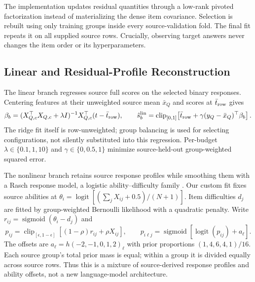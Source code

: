 \documentclass{article}
\newcommand{\clip}{\operatorname{clip}_{[0,1]}}
\newcommand{\sigmoid}{\operatorname{sigmoid}}
\begin{document}
The implementation updates residual quantities through a low-rank pivoted factorization instead of materializing the dense item covariance. Selection is rebuilt using only training groups inside every source-validation fold. The final fit repeats it on all supplied source rows. Crucially, observing target answers never changes the item order or its hyperparameters.

\subsection{Linear and Residual-Profile Reconstruction}
The linear branch regresses source full scores on the selected binary responses. Centering features at their unweighted source mean $\bar x_Q$ and scores at $\bar t_{\rm row}$ gives
\begin{equation}
 \beta_b=(X_{Q,c}^{\top}X_{Q,c}+\lambda I)^{-1}X_{Q,c}^{\top}(t-\bar t_{\rm row}),\qquad
 \hat s^{\rm lin}_b=\clip\!\left[\bar t_{\rm row}+\gamma(y_Q-\bar x_Q)^\top\beta_b\right].
\end{equation}
The ridge fit itself is row-unweighted; group balancing is used for selecting configurations, not silently substituted into this regression. Per-budget $\lambda\in\{0.1,1,10\}$ and $\gamma\in\{0,0.5,1\}$ minimize source-held-out group-weighted squared error.

The nonlinear branch retains source response profiles while smoothing them with a Rasch response model, a logistic ability--difficulty family \citep[Chap.~2]{Baker2001}. Our custom fit fixes source abilities at $\theta_i=\operatorname{logit}[(\sum_jX_{ij}+0.5)/(N+1)]$. Item difficulties $d_j$ are fitted by group-weighted Bernoulli likelihood with a quadratic penalty. Write $r_{ij}=\sigmoid(\theta_i-d_j)$ and
\begin{equation}
 p_{ij}=\operatorname{clip}_{[\epsilon,1-\epsilon]}
       [(1-\rho)r_{ij}+\rho X_{ij}],\qquad
 p_{i\ell j}=\sigmoid[\operatorname{logit}(p_{ij})+a_\ell].
\end{equation}
The offsets are $a_\ell=h(-2,-1,0,1,2)_\ell$ with prior proportions $(1,4,6,4,1)/16$. Each source group's total prior mass is equal; within a group it is divided equally across source rows. Thus this is a mixture of source-derived response profiles and ability offsets, not a new language-model architecture.
\end{document}
